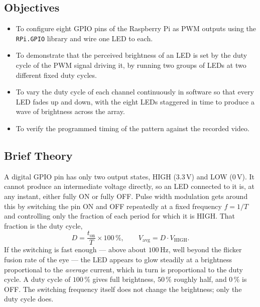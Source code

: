 \documentclass[10pt,a4paper]{article}
\begin{document}
\subsection*{Objectives}
\begin{itemize}
  \item To configure eight GPIO pins of the Raspberry Pi as PWM outputs using the
        \texttt{RPi.GPIO} library and wire one LED to each.
  \item To demonstrate that the perceived brightness of an LED is set by the duty
        cycle of the PWM signal driving it, by running two groups of LEDs at two
        different fixed duty cycles.
  \item To vary the duty cycle of each channel continuously in software so that
        every LED fades up and down, with the eight LEDs staggered in time to produce
        a wave of brightness across the array.
  \item To verify the programmed timing of the pattern against the recorded video.
\end{itemize}

\subsection*{Brief Theory}
A digital GPIO pin has only two output states, HIGH ($3.3\,\mathrm{V}$) and LOW
($0\,\mathrm{V}$). It cannot produce an intermediate voltage directly, so an LED
connected to it is, at any instant, either fully ON or fully OFF. Pulse width
modulation gets around this by switching the pin ON and OFF repeatedly at a fixed
frequency $f = 1/T$ and controlling only the fraction of each period for which it is
HIGH. That fraction is the duty cycle,
\[
  D = \frac{t_{\mathrm{on}}}{T}\times 100\,\%,
  \qquad
  V_{\mathrm{avg}} = D \cdot V_{\mathrm{HIGH}} .
\]
If the switching is fast enough --- above about $100\,\mathrm{Hz}$, well beyond the
flicker fusion rate of the eye --- the LED appears to glow steadily at a brightness
proportional to the \emph{average} current, which in turn is proportional to the duty
cycle. A duty cycle of $100\,\%$ gives full brightness, $50\,\%$ roughly half, and
$0\,\%$ is OFF. The switching frequency itself does not change the brightness; only
the duty cycle does.
\end{document}
